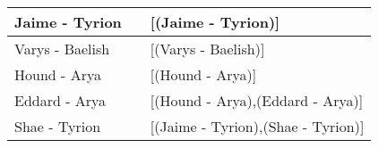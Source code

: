 \documentclass[10pt,a4paper]{article}
\begin{document}
\begin{enumerate}
\begin{table}[H]
\begin{tabular}{|l|l|l|}
		Jaime - Tyrion    &       & {[}(Jaime - Tyrion){]}                                                                                                                                                                                                                                                                                                                                                                                                                                                                               \\ \hline
		Varys - Baelish   &       & {[}(Varys - Baelish){]}                                                                                                                                                                                                                                                                                                                                                                                                                                                                              \\ \hline
		Hound - Arya      &       & {[}(Hound - Arya){]}                                                                                                                                                                                                                                                                                                                                                                                                                                                                                 \\ \hline
		Eddard - Arya     &       & {[}(Hound - Arya),(Eddard - Arya){]}                                                                                                                                                                                                                                                                                                                                                                                                                                                                 \\ \hline
		Shae - Tyrion     &       & {[}(Jaime - Tyrion),(Shae - Tyrion){]}                                                                                                                                                                                                                                                                                                                                                                                                                                                               \\ \hline

\end{tabular}
\end{table}
\end{enumerate}
\end{document}
